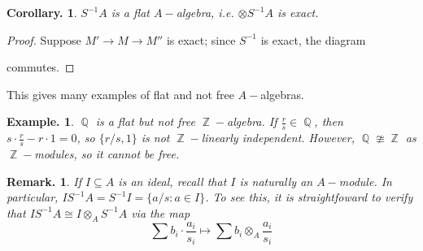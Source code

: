 \documentclass[11pt, a4paper]{memoir}
\DeclareMathOperator{\Q}{{\mathbb{Q}}}
\DeclareMathOperator{\Z}{{\mathbb{Z}}}
\theoremstyle{change}
\newtheorem{corollary}[theorem]{Corollary.}
\theoremstyle{plain}
\theoremstyle{nonumberplain}
\newtheorem{example}{Example.}
\newtheorem{remark}{Remark.}
\newtheorem{proof}{Proof}
\DeclareMathOperator{\id}{id}
\numberwithin{equation}{section}
\begin{document}
\begin{corollary}
    $S^{-1}A$ is a flat $A-$algebra, i.e. $\otimes S^{-1}A$ is exact.
\end{corollary}
\begin{proof}
    Suppose $M'\to M\to M''$ is exact; since $S^{-1}$ is exact, the diagram
    \begin{center}
    \end{center}
    commutes.
\end{proof}
This gives many examples of flat and not free $A-$algebras.
\begin{example}
    $\Q$ is a flat but not free $\Z-$algebra.
    If $\frac{r}{s}\in\Q$, then $s\cdot\frac{r}{s}-r\cdot 1=0$, so $\{r/s,1\}$ is not $\Z-$linearly independent.
    However, $\Q\ncong\Z$ as $\Z-$modules, so it cannot be free.
\end{example}
\begin{remark}
    If $I\subseteq A$ is an ideal, recall that $I$ is naturally an $A-$module.
    In particular, $IS^{-1}A=S^{-1}I=\{a/s:a\in I\}$.
    To see this, it is straightfoward to verify that $IS^{-1}A\cong I\otimes_A S^{-1}A$ via the map
    \begin{equation*}
        \sum b_i\cdot\frac{a_i}{s_i}\mapsto \sum b_i\otimes_A\frac{a_i}{s_i}
    \end{equation*}
\end{remark}
\end{document}
